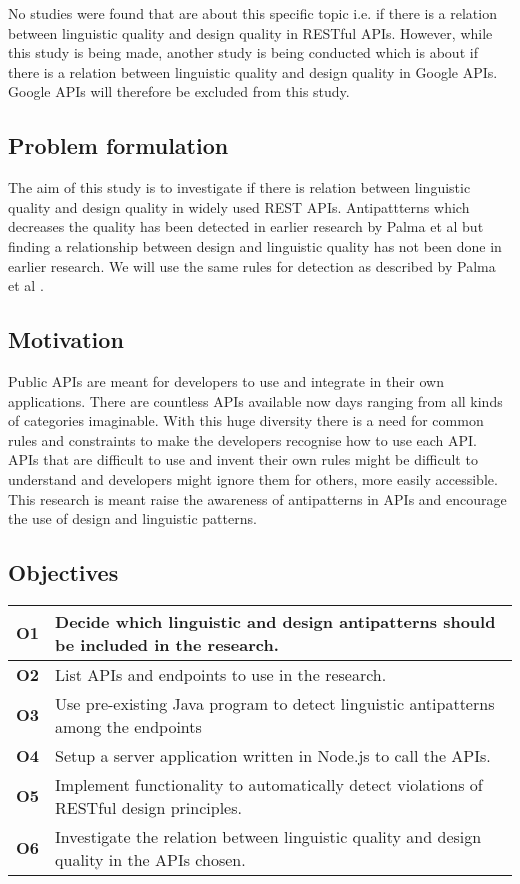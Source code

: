 \documentclass[a4paper,12pt]{article}
\begin{document}
\clearpage

No studies were found that are about this specific topic i.e. if there is a relation between linguistic quality and design quality in RESTful APIs. However, while this study is being made, another study is being conducted which is about if there is a relation between linguistic quality and design quality in Google APIs. Google APIs will therefore be excluded from this study.

\subsection{Problem formulation}
The aim of this study is to investigate if there is relation between  linguistic quality and design quality in widely used REST APIs. Antipattterns which decreases the quality has been detected in earlier research by Palma et al \cite{linguistic}\cite{design} but finding a relationship between design and linguistic quality has not been done in earlier research. We will use the same rules for detection as described by Palma et al \cite{linguistic}\cite{design}.


\subsection{Motivation}
Public APIs are meant for developers to use and integrate in their own applications. There are countless APIs available now days ranging from all kinds of categories imaginable. With this huge diversity there is a need for common rules and constraints to make the developers recognise how to use each API. APIs that are difficult to use and invent their own rules might be difficult to understand and developers might ignore them for others, more easily accessible. This research is meant raise the awareness of antipatterns in APIs and encourage the use of design and linguistic patterns. 

\subsection{Objectives}

\begin{tabular} {|p{1.2cm}|p{11.6cm}|} \hline
\textbf{O1} & Decide which linguistic and design antipatterns should be included in the research. \\ \hline
\textbf{O2} & List APIs and endpoints to use in the research. \\ \hline
\textbf{O3} & Use pre-existing Java program to detect linguistic antipatterns among the endpoints \\ \hline
\textbf{O4} & Setup a server application written in Node.js to call the APIs. \\ \hline
\textbf{O5} & Implement functionality to automatically detect violations of RESTful design principles.\\ \hline
\textbf{O6} & Investigate the relation between linguistic quality and design quality in the APIs chosen. \\ \hline
\end{tabular}
\end{document}
